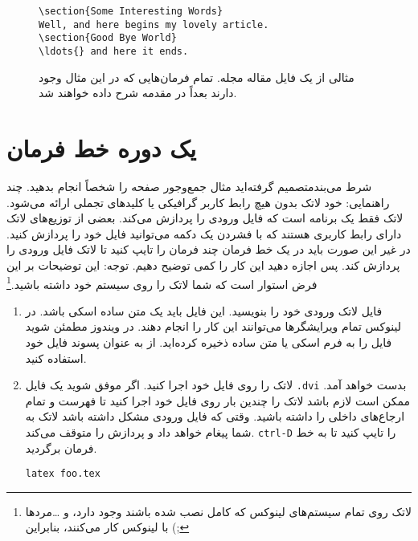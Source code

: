 {\begin{figure}[!htbp]
\begin{lined}{10cm}
\begin{verbatim}
\section{Some Interesting Words}
Well, and here begins my lovely article.
\section{Good Bye World}
\ldots{} and here it ends.

\end{verbatim}
\end{lined}
\setRL
\caption[مثالی از یک فایل مقالهٔ مجله]
{مثالی از یک فایل مقاله مجله.  تمام فرمان‌هایی که در این مثال وجود دارند بعداً در مقدمه شرح داده خواهند شد.} 
\label{document}

\end{figure}
\section{یک دوره خط فرمان}
شرط می‌بندمتصمیم گرفته‌اید مثال جمع‌وجور صفحه 
\pageref{mini}
 را شخصاً انجام بدهید. چند راهنمایی: خود لاتک بدون هیچ رابط کاربر گرافیکی
یا کلیدهای تجملی ارائه می‌شود. لاتک فقط یک برنامه است که فایل ورودی را پردازش می‌کند. بعضی از توزیع‌های لاتک دارای رابط کاربری هستند که با فشردن یک دکمه می‌توانید فایل خود را پردازش کنید. در غیر این صورت باید در یک خط فرمان چند فرمان را تایپ کنید تا لاتک فایل ورودی را پردازش کند. پس اجازه دهید این کار را کمی توضیح دهیم. توجه: این توضیحات بر این فرض استوار است که شما لاتک را روی سیستم خود داشته باشید.\footnote{لاتک روی تمام سیستم‌های لینوکس که کامل نصب شده باشند وجود دارد، و \ldots مردها با لینوکس کار می‌کنند، بنابراین (\lr{-};}
\begin{enumerate}
\item 
  فایل لاتک ورودی خود را بنویسید. این فایل باید یک متن ساده اسکی باشد. در لینوکس تمام ویرایشگرها می‌توانند این کار را انجام دهند. در ویندوز مطمئن شوید فایل را به فرم اسکی یا متن ساده ذخیره کرده‌اید. از  به عنوان پسوند فایل خود استفاده کنید.

\item 
لاتک را روی فایل خود اجرا کنید. اگر موفق شوید یک فایل \texttt{.dvi} بدست خواهد آمد. ممکن است لازم باشد لاتک را چندین بار روی فایل خود اجرا کنید تا فهرست و تمام ارجاع‌های داخلی را داشته باشید. وقتی که فایل ورودی مشکل داشته باشد لاتک به شما پیغام خواهد داد و پردازش را متوقف می‌کند. \texttt{ctrl-D} را تایپ کنید تا به خط فرمان برگردید.
\begin{lscommand}
\verb+latex foo.tex+
\end{lscommand}


\end{enumerate}}

